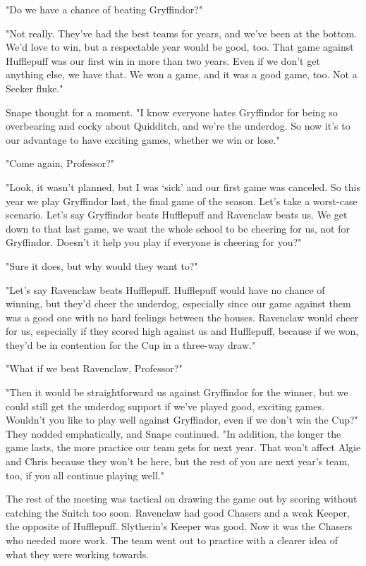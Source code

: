 "Do we have a chance of beating Gryffindor?"

"Not really. They've had the best teams for years, and we've been at the bottom. We'd love to win, but a respectable year would be good, too. That game against Hufflepuff was our first win in more than two years. Even if we don't get anything else, we have that. We won a game, and it was a good game, too. Not a Seeker fluke."

Snape thought for a moment. "I know everyone hates Gryffindor for being so overbearing and cocky about Quidditch, and we're the underdog. So now it's to our advantage to have exciting games, whether we win or lose."

"Come again, Professor?"

"Look, it wasn't planned, but I was `sick' and our first game was canceled. So this year we play Gryffindor last, the final game of the season. Let's take a worst-case scenario. Let's say Gryffindor beats Hufflepuff and Ravenclaw beats us. We get down to that last game, we want the whole school to be cheering for us, not for Gryffindor. Doesn't it help you play if everyone is cheering for you?"

"Sure it does, but why would they want to?"

"Let's say Ravenclaw beats Hufflepuff. Hufflepuff would have no chance of winning, but they'd cheer the underdog, especially since our game against them was a good one with no hard feelings between the houses. Ravenclaw would cheer for us, especially if they scored high against us and Hufflepuff, because if we won, they'd be in contention for the Cup in a three-way draw."

"What if we beat Ravenclaw, Professor?"

"Then it would be straightforward us against Gryffindor for the winner, but we could still get the underdog support if we've played good, exciting games. Wouldn't you like to play well against Gryffindor, even if we don't win the Cup?" They nodded emphatically, and Snape continued. "In addition, the longer the game lasts, the more practice our team gets for next year. That won't affect Algie and Chris because they won't be here, but the rest of you are next year's team, too, if you all continue playing well."

The rest of the meeting was tactical on drawing the game out by scoring without catching the Snitch too soon. Ravenclaw had good Chasers and a weak Keeper, the opposite of Hufflepuff. Slytherin's Keeper was good. Now it was the Chasers who needed more work. The team went out to practice with a clearer idea of what they were working towards.

